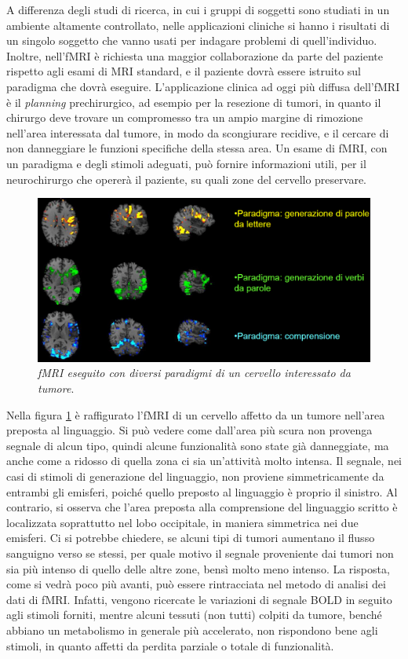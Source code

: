 \documentclass{report}
\newcommand{\figref}[1]{figura \ref{#1}}
\numberwithin{equation}{section}
\numberwithin{figure}{section}
\begin{document}
A differenza degli studi di ricerca, in cui i gruppi di soggetti sono studiati in un ambiente altamente controllato, nelle applicazioni cliniche si hanno i risultati di un singolo soggetto che vanno usati per indagare problemi di quell'individuo. Inoltre, nell'fMRI è richiesta una maggior collaborazione da parte del paziente rispetto agli esami di MRI standard, e il paziente dovrà essere istruito sul paradigma che dovrà eseguire. L'applicazione clinica ad oggi più diffusa dell'fMRI è il \textit{planning} prechirurgico, ad esempio per la resezione di tumori, in quanto il chirurgo deve trovare un compromesso tra un ampio margine di rimozione nell'area interessata dal tumore, in modo da scongiurare recidive, e il cercare di non danneggiare le funzioni specifiche della stessa area. Un esame di fMRI, con un paradigma e degli stimoli adeguati, può fornire informazioni utili, per il neurochirurgo che opererà il paziente, su quali zone del cervello preservare.

\begin{figure}[htp]
\centering
\includegraphics[scale=0.7]{immagini/para.png}
\caption{\label{fig:para} \textit{fMRI eseguito con diversi paradigmi di un cervello interessato da tumore}.}
\end{figure}

Nella \figref{fig:para} è raffigurato l'fMRI di un cervello affetto da un tumore nell'area preposta al linguaggio. Si può vedere come dall'area più scura non provenga segnale di alcun tipo, quindi alcune funzionalità sono state già danneggiate, ma anche come a ridosso di quella zona ci sia un'attività molto intensa. Il segnale, nei casi di stimoli di generazione del linguaggio, non proviene simmetricamente da entrambi gli emisferi, poiché quello preposto al linguaggio è proprio il sinistro. Al contrario, si osserva che l'area preposta alla comprensione del linguaggio scritto è localizzata soprattutto nel lobo occipitale, in maniera simmetrica nei due emisferi. Ci si potrebbe chiedere, se alcuni tipi di tumori aumentano il flusso sanguigno verso se stessi, per quale motivo il segnale proveniente dai tumori non sia più intenso di quello delle altre zone, bensì molto meno intenso. La risposta, come si vedrà poco più avanti, può essere rintracciata nel metodo di analisi dei dati di fMRI. Infatti, vengono ricercate le variazioni di segnale BOLD in seguito agli stimoli forniti, mentre alcuni tessuti (non tutti) colpiti da tumore, benché abbiano un metabolismo in generale più accelerato, non rispondono bene agli stimoli, in quanto affetti da perdita parziale o totale di funzionalità.
\end{document}
